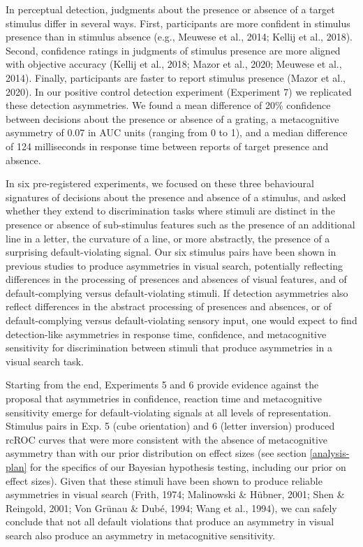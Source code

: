 \documentclass[12pt,twoside]{reedthesis}
\begin{document}
In perceptual detection, judgments about the presence or absence of a target stimulus differ in several ways. First, participants are more confident in stimulus presence than in stimulus absence (e.g., Meuwese et al., 2014; Kellij et al., 2018). Second, confidence ratings in judgments of stimulus presence are more aligned with objective accuracy (Kellij et al., 2018; Mazor et al., 2020; Meuwese et al., 2014). Finally, participants are faster to report stimulus presence (Mazor et al., 2020). In our positive control detection experiment (Experiment 7) we replicated these detection asymmetries. We found a mean difference of 20\% confidence between decisions about the presence or absence of a grating, a metacognitive asymmetry of 0.07 in AUC units (ranging from 0 to 1), and a median difference of 124 milliseconds in response time between reports of target presence and absence.

In six pre-registered experiments, we focused on these three behavioural signatures of decisions about the presence and absence of a stimulus, and asked whether they extend to discrimination tasks where stimuli are distinct in the presence or absence of sub-stimulus features such as the presence of an additional line in a letter, the curvature of a line, or more abstractly, the presence of a surprising default-violating signal. Our six stimulus pairs have been shown in previous studies to produce asymmetries in visual search, potentially reflecting differences in the processing of presences and absences of visual features, and of default-complying versus default-violating stimuli. If detection asymmetries also reflect differences in the abstract processing of presences and absences, or of default-complying versus default-violating sensory input, one would expect to find detection-like asymmetries in response time, confidence, and metacognitive sensitivity for discrimination between stimuli that produce asymmetries in a visual search task.

Starting from the end, Experiments 5 and 6 provide evidence against the proposal that asymmetries in confidence, reaction time and metacognitive sensitivity emerge for default-violating signals at all levels of representation. Stimulus pairs in Exp. 5 (cube orientation) and 6 (letter inversion) produced rcROC curves that were more consistent with the absence of metacognitive asymmetry than with our prior distribution on effect sizes (see section \ref{analysis-plan} for the specifics of our Bayesian hypothesis testing, including our prior on effect sizes). Given that these stimuli have been shown to produce reliable asymmetries in visual search (Frith, 1974; Malinowski \& Hübner, 2001; Shen \& Reingold, 2001; Von Grünau \& Dubé, 1994; Wang et al., 1994), we can safely conclude that not all default violations that produce an asymmetry in visual search also produce an asymmetry in metacognitive sensitivity.
\end{document}
